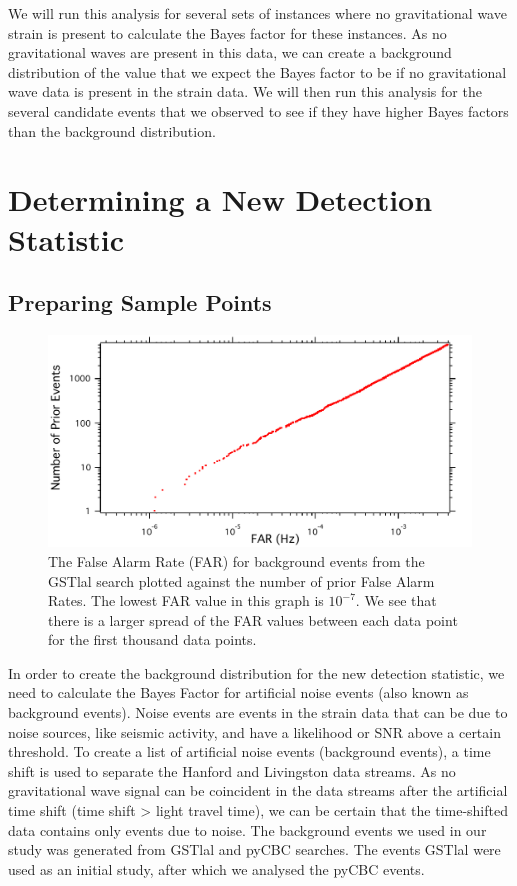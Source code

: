 \documentclass{article}
\begin{document}
 We will run this analysis for several sets of instances where no gravitational wave strain is present to calculate the Bayes factor for these instances. As no gravitational waves are present in this data, we can create a background distribution of the value that we expect the Bayes factor to be if no gravitational wave data is present in the strain data. We will then run this analysis for the several candidate events that we observed to see if they have higher Bayes factors than the background distribution. 
 
 \newpage
 \section{Determining a New Detection Statistic}
 
 
 
 
 
 \subsection{Preparing Sample Points}
 
 
   \begin{figure}[h]
   	\centering
   	\includegraphics[width=1\textwidth]{Figures/FAP_Count.pdf} 
   	\caption{The False Alarm Rate (FAR) for background events from the GSTlal search plotted against the number of prior False Alarm Rates. The lowest FAR value in this graph is $10^{-7}$. We see that there is a larger spread of the FAR values between each data point for the first thousand data points.}
   	\label{Fig:FAR_Count}
   \end{figure}
   
   
 
 
 In order to create the background distribution for the new detection statistic, we need to calculate the Bayes Factor for artificial noise events (also known as background events). Noise events are events in the strain data that can be due to noise sources, like seismic activity, and have a likelihood or SNR above a certain threshold. To create a list of artificial noise events (background events),  a time shift is used to separate the Hanford and Livingston data streams. As no gravitational wave signal can be coincident in the data streams after the artificial time shift (time shift > light travel time), we can be certain that the time-shifted data contains only events due to noise. The background events we used in our study was generated from GSTlal and pyCBC searches. The events GSTlal were used as an initial study, after which we analysed the pyCBC events.\\
 
\end{document}

